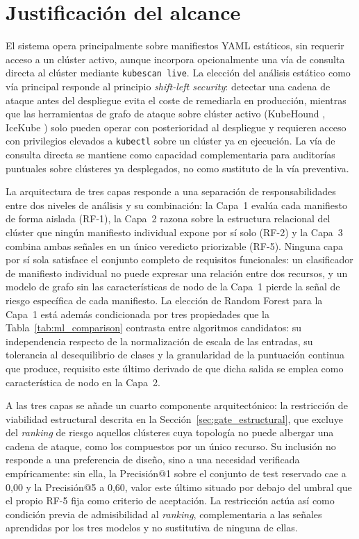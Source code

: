 \section{Justificación del alcance}
\label{sec:alcance}

El sistema opera principalmente sobre manifiestos \acs{YAML} estáticos, sin
requerir acceso a un clúster activo, aunque incorpora opcionalmente una vía de
consulta directa al clúster mediante \texttt{kubescan live}. La elección del
análisis estático como vía principal responde al principio \textit{shift-left
security}: detectar una cadena de ataque antes del despliegue evita el coste de
remediarla en producción, mientras que las herramientas de grafo de ataque sobre
clúster activo (KubeHound \citep{KubeHound2023}, IceKube
\citep{IceKube2023}) solo pueden operar con posterioridad al despliegue y
requieren acceso con privilegios elevados a \texttt{kubectl} sobre un clúster ya
en ejecución. La vía de consulta directa se mantiene
como capacidad complementaria para auditorías puntuales sobre clústeres ya
desplegados, no como sustituto de la vía preventiva.

La arquitectura de tres capas responde a una separación de responsabilidades
entre dos niveles de análisis y su combinación: la Capa~1 evalúa cada manifiesto
de forma aislada (RF-1), la Capa~2 razona sobre la estructura relacional del
clúster que ningún manifiesto individual expone por sí solo (RF-2) y la Capa~3
combina ambas señales en un único veredicto priorizable (RF-5). Ninguna capa por
sí sola satisface el conjunto completo de requisitos funcionales: un clasificador
de manifiesto individual no puede expresar una relación entre dos recursos, y un
modelo de grafo sin las características de nodo de la Capa~1 pierde la señal de
riesgo específica de cada manifiesto. La elección de Random Forest para
la Capa~1 está además condicionada por tres propiedades que la
Tabla~\ref{tab:ml_comparison} contrasta entre algoritmos candidatos: su
independencia respecto de la normalización de escala de las entradas, su
tolerancia al desequilibrio de clases y la granularidad de la puntuación continua
que produce, requisito este último derivado de que dicha salida se emplea como
característica de nodo en la Capa~2.

A las tres capas se añade un cuarto componente arquitectónico: la restricción
de viabilidad estructural descrita en la Sección~\ref{sec:gate_estructural}, que
excluye del \textit{ranking} de riesgo aquellos clústeres cuya topología no
puede albergar una cadena de ataque, como los compuestos por un único recurso.
Su inclusión no responde a una preferencia de diseño, sino a una necesidad
verificada empíricamente: sin ella, la Precisión@1 sobre el conjunto de test
reservado cae a 0,00 y la Precisión@5 a 0,60, valor este último situado por
debajo del umbral que el propio RF-5 fija como criterio de aceptación. La
restricción actúa así como condición previa de admisibilidad al \textit{ranking},
complementaria a las señales aprendidas por los tres modelos y no sustitutiva de
ninguna de ellas.

